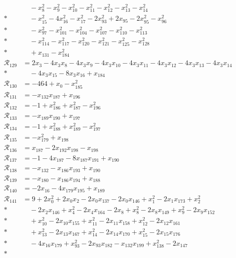 \begin{align*}
&\quad -x_{8}^{2} -x_{9}^{2} -x_{10}^{2} -x_{11}^{2} -x_{12}^{2} -x_{13}^{2} -x_{14}^{2} \\*
&\quad -x_{15}^{2} -4x_{16}^{2} -x_{17}^{2} -2x_{93}^{2} +2x_{95} -2x_{95}^{2} -x_{96}^{2} \\*
&\quad -x_{97}^{2} -x_{101}^{2} -x_{104}^{2} -x_{107}^{2} -x_{110}^{2} -x_{113}^{2} \\*
&\quad -x_{114}^{2} -x_{117}^{2} -x_{120}^{2} -x_{121}^{2} -x_{125}^{2} -x_{128}^{2} \\*
&\quad +x_{131} -x_{184}^{2} \\
\mathcal R_{129} &= 2x_{3} -4x_{3}x_{8} -4x_{3}x_{9} -4x_{3}x_{10} -4x_{3}x_{11} -4x_{3}x_{12} -4x_{3}x_{13} -4x_{3}x_{14} \\*
&\quad -4x_{3}x_{15} -8x_{3}x_{16} +x_{184} \\
\mathcal R_{130} &= -464 +x_{0} -x_{185}^{2} \\
\mathcal R_{131} &= -x_{132}x_{187} +x_{196} \\
\mathcal R_{132} &= -1 +x_{186}^{2} +x_{187}^{2} -x_{196}^{2} \\
\mathcal R_{133} &= -x_{189}x_{190} +x_{197} \\
\mathcal R_{134} &= -1 +x_{188}^{2} +x_{189}^{2} -x_{197}^{2} \\
\mathcal R_{135} &= -x_{179}^{2} +x_{198} \\
\mathcal R_{136} &= x_{187} -2x_{192}x_{198} -x_{198} \\
\mathcal R_{137} &= -1 -4x_{187} -8x_{187}x_{191} +x_{190} \\
\mathcal R_{138} &= -x_{132} -x_{186}x_{193} +x_{190} \\
\mathcal R_{139} &= -x_{180} -x_{186}x_{194} +x_{188} \\
\mathcal R_{140} &= -2x_{16} -4x_{179}x_{195} +x_{189} \\
\mathcal R_{141} &= 9 +2x_{0}^{2} +2x_{0}x_{2} -2x_{0}x_{137} -2x_{0}x_{146} +x_{1}^{2} -2x_{1}x_{173} +x_{2}^{2} \\*
&\quad -2x_{2}x_{146} +x_{4}^{2} -2x_{4}x_{164} -2x_{8} +x_{8}^{2} -2x_{8}x_{149} +x_{9}^{2} -2x_{9}x_{152} \\*
&\quad +x_{10}^{2} -2x_{10}x_{155} +x_{11}^{2} -2x_{11}x_{158} +x_{12}^{2} -2x_{12}x_{161} \\*
&\quad +x_{13}^{2} -2x_{13}x_{167} +x_{14}^{2} -2x_{14}x_{170} +x_{15}^{2} -2x_{15}x_{176} \\*
&\quad -4x_{16}x_{179} +x_{93}^{2} -2x_{93}x_{182} -x_{132}x_{199} +x_{138}^{2} -2x_{147} \\*

\end{align*}
